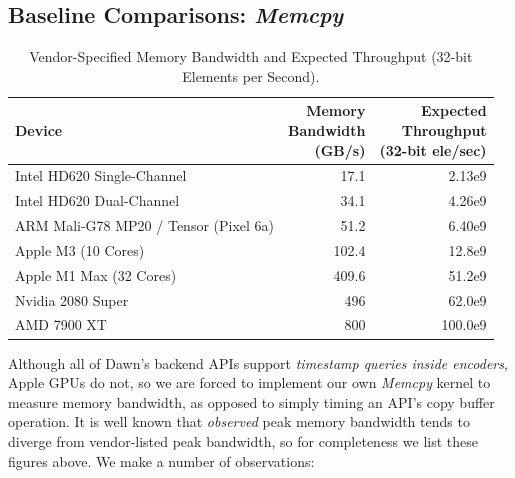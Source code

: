 \documentclass[acmsmall, manuscript, screen, review, anonymous]{acmart}
\begin{document}
\subsection{Baseline Comparisons: \emph{Memcpy}}%
\label{sec:memcpy}
\begin{table}
  \small
  \centering
  \begin{tabular}{l r r}
    \toprule
    Device                                & \makecell{Memory           \\ Bandwidth \\ (GB/s)} & \makecell{Expected \\ Throughput \\ (32-bit ele/sec)} \\
    \midrule
    Intel HD620 Single-Channel            & 17.1             & 2.13e9  \\
    Intel HD620 Dual-Channel              & 34.1             & 4.26e9  \\
    ARM Mali-G78 MP20 / Tensor (Pixel 6a) & 51.2             & 6.40e9  \\
    Apple M3 (10 Cores)                   & 102.4            & 12.8e9  \\
    Apple M1 Max (32 Cores)               & 409.6            & 51.2e9  \\
    Nvidia 2080 Super                     & 496              & 62.0e9  \\
    AMD 7900 XT                           & 800              & 100.0e9 \\
    \bottomrule
  \end{tabular}
  \caption{Vendor-Specified Memory Bandwidth and Expected Throughput (32-bit Elements per Second).\label{tab:memory_bandwidth}}
\end{table}
Although all of Dawn's backend APIs support \emph{timestamp queries inside encoders}, Apple GPUs do not, so we are forced to implement our own \emph{Memcpy} kernel to measure memory bandwidth, as opposed to simply timing an API's copy buffer operation. It is well known that \emph{observed} peak memory bandwidth tends to diverge from vendor-listed peak bandwidth, so for completeness we list these figures above. We make a number of observations:
\end{document}
